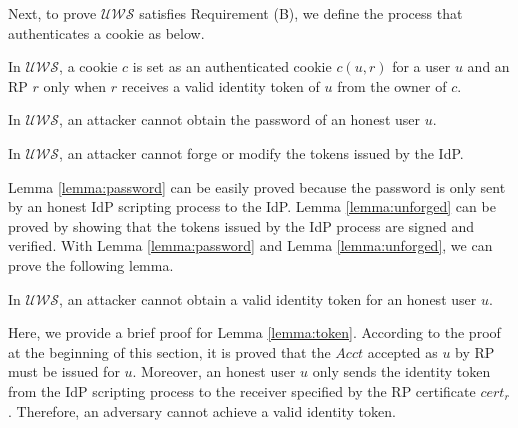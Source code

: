 Next, to prove $\mathcal{UWS}$ satisfies Requirement (B), we define the process that authenticates a cookie as below.
\vspace{-\topsep}
\begin{definition}
In $\mathcal{UWS}$, a cookie $c$ is set as an authenticated cookie $c(u,r)$ for a user $u$ and an RP $r$ only when $r$ receives a valid identity token of $u$ from the owner of $c$.
\label{def:cookie}
\end{definition}
\vspace{-\topsep}
\vspace{-\topsep}
\begin{lemma}
In $\mathcal{UWS}$, an attacker cannot obtain the password of an honest user $u$.
\label{lemma:password}
\end{lemma}
\vspace{-\topsep}
\vspace{-\topsep}
\begin{lemma}
In $\mathcal{UWS}$, an attacker cannot forge or modify the tokens issued by the IdP.
\label{lemma:unforged}
\end{lemma}
\vspace{-\topsep}
Lemma \ref{lemma:password} can be easily proved because the password is only sent by an honest IdP scripting process to the IdP. Lemma \ref{lemma:unforged} can be proved by showing that the tokens issued by the IdP process are signed and verified. With Lemma \ref{lemma:password} and Lemma \ref{lemma:unforged}, we can prove the following lemma.
\vspace{-\topsep}
\begin{lemma}
In $\mathcal{UWS}$, an attacker cannot obtain a valid identity token for an honest user $u$.
\label{lemma:token}
\end{lemma}
\vspace{-\topsep}
Here, we provide a brief proof for Lemma \ref{lemma:token}.
According to the proof at the beginning of this section, it is proved that the $Acct$ accepted as $u$ by RP must be issued for $u$. Moreover,  an honest user $u$ only sends the identity token from the IdP scripting process to the receiver specified by the RP certificate $cert_r$.  Therefore, an adversary cannot achieve a valid identity token.
